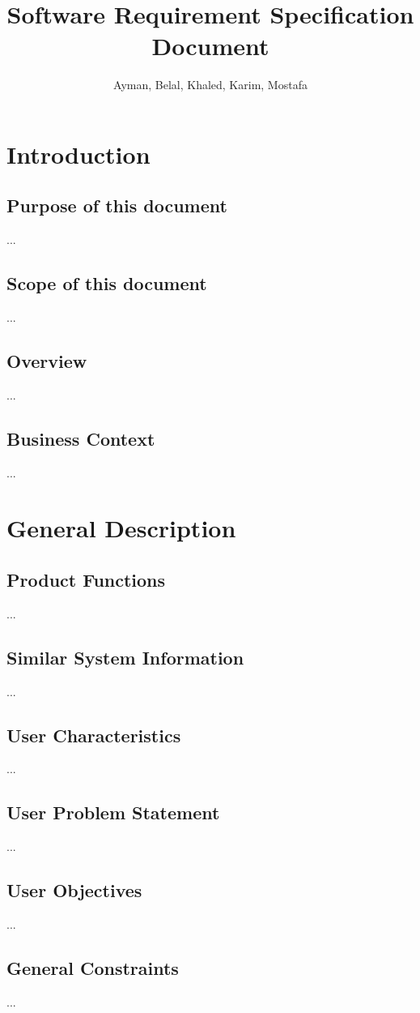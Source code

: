 \documentclass[]{article}
\title{Software Requirement Specification Document}
\author{Ayman, Belal, Khaled, Karim, Mostafa}
\begin{document}
\maketitle

\section{Introduction}
\subsection{Purpose of this document}
...
\subsection{ Scope of this document}
...
\subsection{Overview}
...
\subsection{ Business Context}
...




\section{General Description}
\subsection{Product Functions}
...
\subsection{Similar System Information}
...
\subsection{ User Characteristics}
...
\subsection{ User Problem Statement}
...
\subsection{ User Objectives}
...
\subsection{ General Constraints}
...
\end{document}
